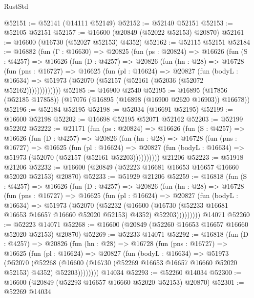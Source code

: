 \begin{lexlean}{RustStd}
\begin{coremodule}
{\begin{coremodule}
{{{{{{{{{{{{{{{{{{{{{{{{{{{{{{{{{{{{{{{{{{{{{{{{{{{{{{{@52151 := @52141 (@14111 @52149)
@52152 := @52140 @52151
@52153 := @52105 @52151
@52157 := @16600 (@20849 (@52022 @52153) @20870)
@52161 := @16600 (@16730 (@52027 @52153) @4352)
@52162 := @52115 @52151
@52184 := @16882
    (fun (Γ : @16630) =>
    @20825
      (fun (ps : @20824) =>
      @16626
        (fun (S : @4257) =>
        @16626
          (fun (D : @4257) =>
          @20826
            (fun (hn : @28) =>
            @16728
              (fun (pns : @16727) =>
              @16625
                (fun (pl : @16624) =>
                @20827
                  (fun (bodyL : @16634) =>
                  @51973 (@52070 (@52157 (@52161 (@52036 (@52072 @52162)))))))))))))
@52185 := @16900 @2540
@52195 := @16895 (@17856 (@52185 @17858)) (@17076 (@16895 (@16898 (@16900 @2620 @16903)) @16678))
@52196 := @52184 @52195
@52198 := @52034 (@16691 @52195)
@52199 := @16600 @52198
@52202 := @16698 @52195 @52071 @52162
@52203 := @52199 @52202
@52222 := @21171
    (fun (ps : @20824) =>
    @16626
      (fun (S : @4257) =>
      @16626
        (fun (D : @4257) =>
        @20826
          (fun (hn : @28) =>
          @16728
            (fun (pns : @16727) =>
            @16625
              (fun (pl : @16624) =>
              @20827 (fun (bodyL : @16634) => @51973 (@52070 (@52157 (@52161 @52203))))))))))
    @21206
@52223 := @51918 @21206
@52232 := @16600 (@20849 (@52223 @16681 @16653 @16657 @16660 @52020 @52153) @20870)
@52233 := @51929 @21206
@52259 := @16818
    (fun (S : @4257) =>
    @16626
      (fun (D : @4257) =>
      @20826
        (fun (hn : @28) =>
        @16728
          (fun (pns : @16727) =>
          @16625
            (fun (pl : @16624) =>
            @20827
              (fun (bodyL : @16634) =>
              @51973
                (@52070
                  (@52232
                    (@16600
                      (@16730 (@52233 @16681 @16653 @16657 @16660 @52020 @52153) @4352)
                      @52203)))))))))
    @14071
@52260 := @52223 @14071
@52268 := @16600 (@20849 (@52260 @16653 @16657 @16660 @52020 @52153) @20870)
@52269 := @52233 @14071
@52292 := @16818
    (fun (D : @4257) =>
    @20826
      (fun (hn : @28) =>
      @16728
        (fun (pns : @16727) =>
        @16625
          (fun (pl : @16624) =>
          @20827
            (fun (bodyL : @16634) =>
            @51973
              (@52070
                (@52268
                  (@16600 (@16730 (@52269 @16653 @16657 @16660 @52020 @52153) @4352) @52203))))))))
    @14034
@52293 := @52260 @14034
@52300 := @16600 (@20849 (@52293 @16657 @16660 @52020 @52153) @20870)
@52301 := @52269 @14034
}}}}}}}}}}}}}}}}}}}}}}}}}}}}}}}}}}}}}}}}}}}}}}}}}}}}}}}
\end{coremodule}}
\end{coremodule}
\end{lexlean}
